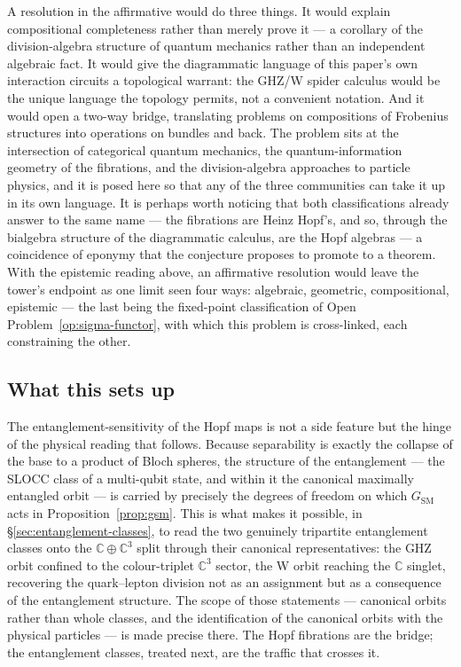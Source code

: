 A resolution in the affirmative would do three things. It would explain compositional completeness
rather than merely prove it --- a corollary of the division-algebra structure of quantum mechanics
rather than an independent algebraic fact. It would give the diagrammatic language of this paper's
own interaction circuits a topological warrant: the GHZ/W spider calculus would be the unique
language the topology permits, not a convenient notation. And it would open a two-way bridge,
translating problems on compositions of Frobenius structures into operations on bundles and back.
The problem sits at the intersection of categorical quantum mechanics, the quantum-information
geometry of the fibrations, and the division-algebra approaches to particle physics, and it is posed
here so that any of the three communities can take it up in its own language. It is perhaps worth
noticing that both classifications already answer to the same name --- the fibrations are Heinz
Hopf's, and so, through the bialgebra structure of the diagrammatic calculus, are the Hopf algebras
--- a coincidence of eponymy that the conjecture proposes to promote to a theorem. With the
epistemic reading above, an affirmative resolution would leave the tower's endpoint as one limit
seen four ways: algebraic, geometric, compositional, epistemic --- the last being the fixed-point
classification of Open Problem~\ref{op:sigma-functor}, with which this problem is cross-linked,
each constraining the other.

\subsection{What this sets up}

The entanglement-sensitivity of the Hopf maps is not a side feature but the hinge of the physical reading that follows. Because separability is exactly the collapse of the base to a product of Bloch spheres, the structure of the entanglement --- the SLOCC class of a multi-qubit state, and within it the canonical maximally entangled orbit --- is carried by precisely the degrees of freedom on which $G_{\mathrm{SM}}$ acts in Proposition~\ref{prop:gsm}. This is what makes it possible, in \S\ref{sec:entanglement-classes}, to read the two genuinely tripartite entanglement classes onto the $\mathbb{C} \oplus \mathbb{C}^3$ split through their canonical representatives: the GHZ orbit confined to the colour-triplet $\mathbb{C}^3$ sector, the W orbit reaching the $\mathbb{C}$ singlet, recovering the quark--lepton division not as an assignment but as a consequence of the entanglement structure. The scope of those statements --- canonical orbits rather than whole classes, and the identification of the canonical orbits with the physical particles --- is made precise there. The Hopf fibrations are the bridge; the entanglement classes, treated next, are the traffic that crosses it.
